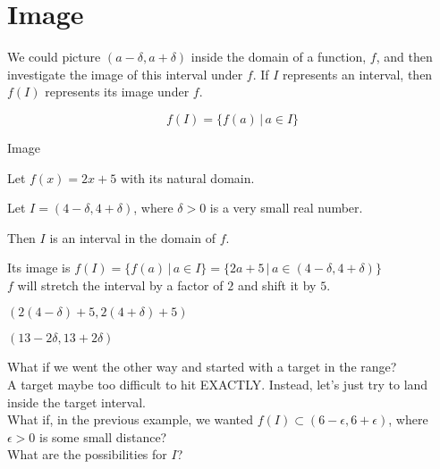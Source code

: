 \documentclass{ximera}
\begin{document}
\section{Image}


We could picture $(a-\delta, a+\delta)$ inside the domain of a function, $f$, and then investigate the image of this interval under $f$.  If $I$ represents an interval, then $f(I)$ represents its image under $f$.


\[       f(I) = \{   f(a)  \, | \, a \in I            \}             \]




\begin{example} Image

Let $f(x) = 2x + 5$ with its natural domain.

Let  $I = (4-\delta, 4+\delta)$, where $\delta > 0$ is a very small real number.

Then $I$ is an interval in the domain of $f$.


Its image is $f(I) = \{   f(a)  \, | \, a \in I \}  = \{   2a+5  \, | \, a \in (4-\delta, 4+\delta) \}$  \\



$f$ will stretch the interval by a factor of $2$ and shift it by $5$.


$(2(4-\delta)+5, 2(4+\delta)+5)$


$(13-2\delta, 13+2\delta)$






\end{example}













What if we went the other way and started with a target in the range? \\

A target maybe too difficult to hit EXACTLY.  Instead, let's just try to land inside the target interval. \\



What if, in the previous example, we wanted $f(I) \subset (6-\epsilon, 6+\epsilon)$, where $\epsilon > 0$ is some small distance?  \\


What are the possibilities for $I$?  \\
\end{document}
